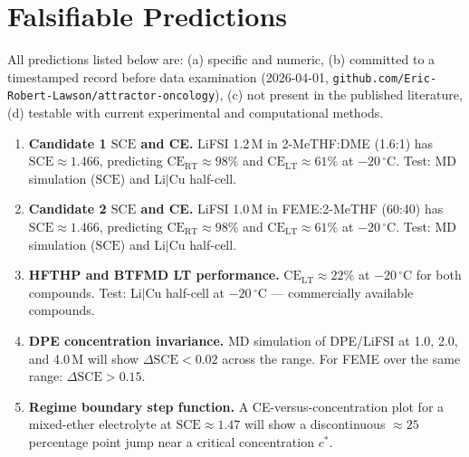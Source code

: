 \documentclass[12pt,letterpaper]{article}
\newcommand{\mSCE}{\mathrm{SCE}}
\newcommand{\mCERT}{\mathrm{CE}_{\mathrm{RT}}}
\newcommand{\mCELT}{\mathrm{CE}_{\mathrm{LT}}}
\begin{document}
\section{Falsifiable Predictions}
\label{sec:predictions}

All predictions listed below are:
(a) specific and numeric,
(b) committed to a timestamped record before data
    examination (2026-04-01,
    \texttt{github.com/Eric-Robert-Lawson/attractor-oncology}),
(c) not present in the published literature,
(d) testable with current experimental and
    computational methods.

\begin{enumerate}
  \item \textbf{Candidate 1 $\mSCE$ and CE.}
        LiFSI 1.2\,M in 2-MeTHF:DME (1.6:1) has
        $\mSCE \approx 1.466$, predicting
        $\mCERT \approx 98\%$ and
        $\mCELT \approx 61\%$
        at $-20\,^{\circ}\mathrm{C}$.
        Test: MD simulation ($\mSCE$) and
        Li$|$Cu half-cell.

  \item \textbf{Candidate 2 $\mSCE$ and CE.}
        LiFSI 1.0\,M in FEME:2-MeTHF (60:40) has
        $\mSCE \approx 1.466$, predicting
        $\mCERT \approx 98\%$ and
        $\mCELT \approx 61\%$
        at $-20\,^{\circ}\mathrm{C}$.
        Test: MD simulation ($\mSCE$) and
        Li$|$Cu half-cell.

  \item \textbf{HFTHP and BTFMD LT performance.}
        $\mCELT \approx 22\%$
        at $-20\,^{\circ}\mathrm{C}$
        for both compounds.
        Test: Li$|$Cu half-cell at
        $-20\,^{\circ}\mathrm{C}$ ---
        commercially available compounds.

  \item \textbf{DPE concentration invariance.}
        MD simulation of DPE/LiFSI at 1.0, 2.0,
        and 4.0\,M will show
        $\Delta\mSCE < 0.02$ across the range.
        For FEME over the same range:
        $\Delta\mSCE > 0.15$.

  \item \textbf{Regime boundary step function.}
        A CE-versus-concentration plot for a
        mixed-ether electrolyte at
        $\mSCE \approx 1.47$ will show a discontinuous
        $\approx 25$ percentage point jump near a
        critical concentration $c^{*}$.


\end{enumerate}
\end{document}
